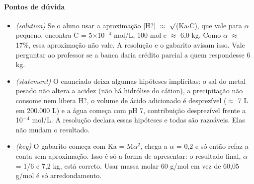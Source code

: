 \documentclass{article}%
\begin{document}
\paragraph{Pontos de dúvida}%
\begin{itemize}%
\item%
\textit{(solution)} Se o aluno usar a aproximação {[}H?{]} $\approx$ $\surd$(Ka$\cdot$C), que vale para $\alpha$ pequeno, encontra C = 5$\times$10$^{-}$$^{4}$ mol/L, 100 mol e $\approx$ 6,0 kg. Como $\alpha$ $\approx$ 17\%, essa aproximação não vale. A resolução e o gabarito avisam isso. Vale perguntar ao professor se a banca daria crédito parcial a quem respondesse 6 kg.%
\item%
\textit{(statement)} O enunciado deixa algumas hipóteses implícitas: o sal do metal pesado não altera a acidez (não há hidrólise do cátion), a precipitação não consome nem libera H?, o volume de ácido adicionado é desprezível ($\approx$ 7 L em 200.000 L) e a água começa com pH 7, contribuição desprezível frente a 10$^{-}$$^{4}$ mol/L. A resolução declara essas hipóteses e todas são razoáveis. Elas não mudam o resultado.%
\item%
\textit{(key)} O gabarito começa com Ka = M$\alpha$$^2$, chega a $\alpha$ = 0,2 e só então refaz a conta sem aproximação. Isso é só a forma de apresentar: o resultado final, $\alpha$ = 1/6 e 7,2 kg, está correto. Usar massa molar 60 g/mol em vez de 60,05 g/mol é só arredondamento.%
\end{itemize}%
\end{document}
